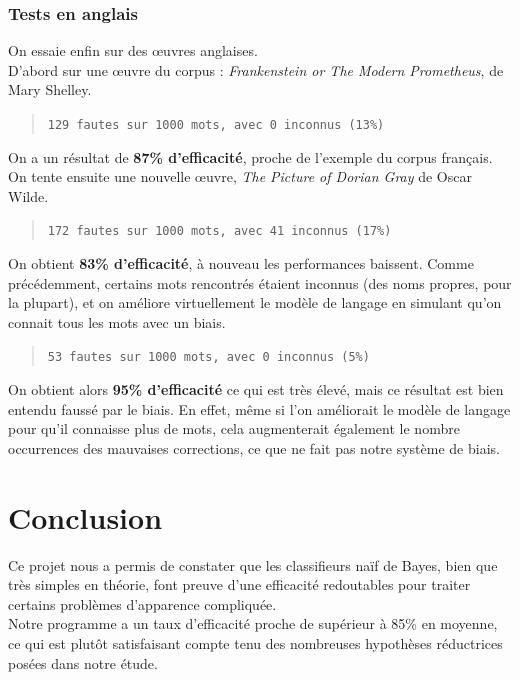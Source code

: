 \documentclass[10pt,a4paper]{article}
\begin{document}
\subsubsection{Tests en anglais}

On essaie enfin sur des œuvres anglaises.\\ D'abord sur une œuvre du corpus : \textit{Frankenstein or The Modern Prometheus}, de Mary Shelley. 

\begin{quote} 
\centering 
\verb!129 fautes sur 1000 mots, avec 0 inconnus (13%)!
\end{quote}

On a un résultat de \textbf{87\% d'efficacité}, proche de l'exemple du corpus français. On tente ensuite une nouvelle œuvre, \textit{The Picture of Dorian Gray} de Oscar Wilde.

\begin{quote} 
\centering 
\verb!172 fautes sur 1000 mots, avec 41 inconnus (17%)!
\end{quote}

On obtient \textbf{83\% d'efficacité}, à nouveau les performances baissent. Comme précédemment, certains mots rencontrés étaient inconnus (des noms propres, pour la plupart), et on améliore virtuellement le modèle de langage en simulant qu'on connait tous les mots avec un biais.

\begin{quote} 
\centering 
\verb!53 fautes sur 1000 mots, avec 0 inconnus (5%)!
\end{quote}

On obtient alors \textbf{95\% d'efficacité} ce qui est très élevé, mais ce résultat est bien entendu faussé par le biais. En effet, même si l'on améliorait le modèle de langage pour qu'il connaisse plus de mots, cela augmenterait également le nombre occurrences des mauvaises corrections, ce que ne fait pas notre système de biais.

\newpage
\section{Conclusion}

Ce projet nous a permis de constater que les classifieurs naïf de Bayes, bien que très simples en théorie, font preuve d'une efficacité redoutables pour traiter certains problèmes d'apparence compliquée.\\

Notre programme a un taux d'efficacité proche de supérieur à 85\% en moyenne, ce qui est plutôt satisfaisant compte tenu des nombreuses hypothèses réductrices posées dans notre étude.\\
\end{document}
